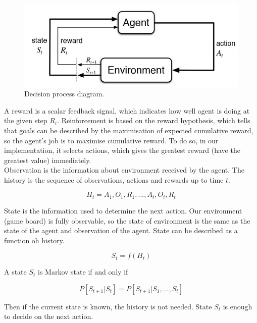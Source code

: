 \documentclass[a4paper,12pt]{book}
\begin{document}
\begin{figure}[!h]
	\includegraphics{./Images/RLdiag.jpg}
	\centering
	\caption{Decision process diagram\protect\footnotemark.}
	\label{fig:Capture1}
\end{figure}

A reward is a scalar feedback signal, which indicates how well agent is doing at the given step $R_{t}$. Reinforcement is based on the reward hypothesis, which tells that goals can be described by the maximisation of expected cumulative reward, so the agent's job is to maximise cumulative reward. To do so, in our implementation, it selects actions, which gives the greatest reward (have the greatest value) immediately. 
\\Observation is the information about environment received by the agent. The history is the sequence of observations, actions and rewards up to time $t$.

\begin{equation}
	H_{t} = A_{1}, O_{1}, R_{1}, ...,  A_{t}, O_{t}, R_{t}
\end{equation}

State is the information used to determine the next action. Our environment (game board) is fully observable, so the state of environment is the same as the state of the agent and observation of the agent. State can be described as a function oh history.

\begin{equation}
	S_{t} = f(H_{t})
\end{equation}

A state $S_{t}$ is Markov state if and only if

\begin{equation}
	P[S_{t+1} | S_{t}] = P[S_{t+1} | S_{1}, ..., S_{t}]
\end{equation}

Then if the current state is known, the history is not needed. State $S_{t}$ is enough to decide on the next action.
\\
\end{document}
